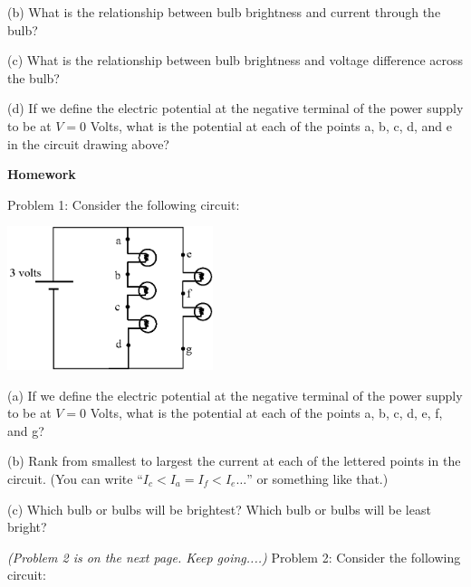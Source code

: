 (b) What is the relationship between bulb brightness and current through the bulb?
\vspace{0.5 in}

(c) What is the relationship between bulb brightness and voltage difference across the bulb?
\vspace{0.5 in}

\newpage
\begin{samepage} %
(d) If we define the electric potential at the negative terminal of the power supply to be at $V=0$ Volts, what is the potential at each of the points a, b, c, d, and e in the circuit drawing above?  
\vspace*{0.6 in}
\end{samepage}

\textbf{Homework}

Problem 1: Consider the following circuit:

\begin{center}
\includegraphics[width=0.45\textwidth]{electric_circuits/circ_diag6.eps}
\end{center}
\vspace{-0.1in}

(a) If we define the electric potential at the negative terminal of the power supply to be at $V=0$ Volts, what is the potential at each of the points a, b, c, d, e, f, and g?  
\vspace{0.7 in}

(b) Rank from smallest to largest the current at each of the lettered points in the circuit.   (You can write ``$I_c<I_a=I_f<I_e…$'' or something like that.) 
\vspace{0.7 in}

(c) Which bulb or bulbs will be brightest?  Which bulb or bulbs will be least bright?
\vspace{1.7 in}

\textit{(Problem 2 is on the next page.  Keep going....)}
\newpage
Problem 2: Consider the following circuit:

